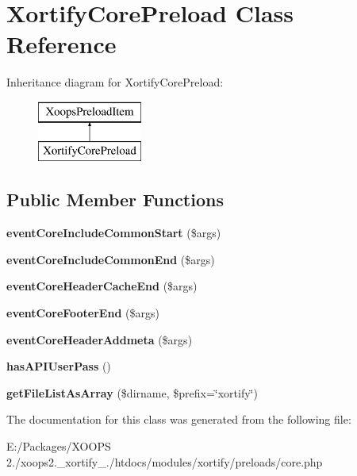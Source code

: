 \hypertarget{class_xortify_core_preload}{\section{Xortify\-Core\-Preload Class Reference}
\label{class_xortify_core_preload}
}
Inheritance diagram for Xortify\-Core\-Preload\-:\begin{figure}[H]
\begin{center}
\leavevmode
\includegraphics[height=2.000000cm]{class_xortify_core_preload}
\end{center}
\end{figure}
\subsection*{Public Member Functions}
\begin{DoxyCompactItemize}
\item 
\hypertarget{class_xortify_core_preload_aa9e34a6cb981ff3de315accaf94f3edf}{{\bfseries event\-Core\-Include\-Common\-Start} (\$args)}\label{class_xortify_core_preload_aa9e34a6cb981ff3de315accaf94f3edf}

\item 
\hypertarget{class_xortify_core_preload_a7d07a451304b0a9d4aa3a86cac9be638}{{\bfseries event\-Core\-Include\-Common\-End} (\$args)}\label{class_xortify_core_preload_a7d07a451304b0a9d4aa3a86cac9be638}

\item 
\hypertarget{class_xortify_core_preload_a7331ad12586d46cf19d7ea9cb5ac971e}{{\bfseries event\-Core\-Header\-Cache\-End} (\$args)}\label{class_xortify_core_preload_a7331ad12586d46cf19d7ea9cb5ac971e}

\item 
\hypertarget{class_xortify_core_preload_ab74befc15dd06fbe66bf0211b32fa5a8}{{\bfseries event\-Core\-Footer\-End} (\$args)}\label{class_xortify_core_preload_ab74befc15dd06fbe66bf0211b32fa5a8}

\item 
\hypertarget{class_xortify_core_preload_a11aa20d0a6b1a9dee4b28e798eeb4cb4}{{\bfseries event\-Core\-Header\-Addmeta} (\$args)}\label{class_xortify_core_preload_a11aa20d0a6b1a9dee4b28e798eeb4cb4}

\item 
\hypertarget{class_xortify_core_preload_a5db7004573d4d388c875e485e6f6799d}{{\bfseries has\-A\-P\-I\-User\-Pass} ()}\label{class_xortify_core_preload_a5db7004573d4d388c875e485e6f6799d}

\item 
\hypertarget{class_xortify_core_preload_aec8ea4c055b1dbd5b8b70c13fbed4371}{{\bfseries get\-File\-List\-As\-Array} (\$dirname, \$prefix=\char`\"{}xortify\char`\"{})}\label{class_xortify_core_preload_aec8ea4c055b1dbd5b8b70c13fbed4371}

\end{DoxyCompactItemize}


The documentation for this class was generated from the following file\-:\begin{DoxyCompactItemize}
\item 
E\-:/\-Packages/\-X\-O\-O\-P\-S 2./xoops2.\-\_\-xortify\-\_./htdocs/modules/xortify/preloads/core.\-php\end{DoxyCompactItemize}
